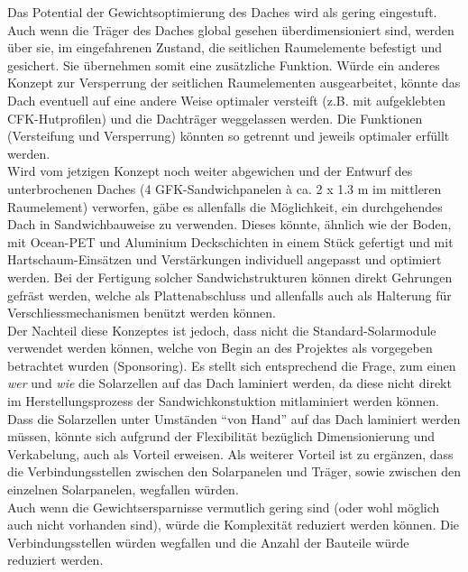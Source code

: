 Das Potential der Gewichtsoptimierung des Daches wird als gering eingestuft. Auch wenn die Träger des Daches global gesehen überdimensioniert sind, werden über sie, im eingefahrenen Zustand, die seitlichen Raumelemente befestigt und gesichert. Sie übernehmen somit eine zusätzliche Funktion. Würde ein anderes Konzept zur Versperrung der seitlichen Raumelementen ausgearbeitet, könnte das Dach eventuell auf eine andere Weise optimaler versteift (z.B. mit aufgeklebten CFK-Hutprofilen) und die Dachträger weggelassen werden. Die Funktionen (Versteifung und Versperrung) könnten so getrennt und jeweils optimaler erfüllt werden.\\
Wird vom jetzigen Konzept noch weiter abgewichen und der Entwurf des unterbrochenen Daches (4 GFK-Sandwichpanelen à ca. 2 x 1.3 m im mittleren Raumelement) verworfen, gäbe es allenfalls die Möglichkeit, ein durchgehendes Dach in Sandwichbauweise zu verwenden. Dieses könnte, ähnlich wie der Boden, mit Ocean-PET und Aluminium Deckschichten in einem Stück gefertigt und mit Hartschaum-Einsätzen und Verstärkungen individuell angepasst und optimiert werden.
Bei der Fertigung solcher Sandwichstrukturen können direkt Gehrungen gefräst werden, welche als Plattenabschluss und allenfalls auch als Halterung für Verschliessmechanismen benützt werden können.\\
Der Nachteil diese Konzeptes ist jedoch, dass nicht die Standard-Solarmodule verwendet werden können, welche von Begin an des Projektes als vorgegeben betrachtet wurden (Sponsoring). Es stellt sich entsprechend die Frage, zum einen \emph{wer} und \emph{wie} die Solarzellen auf das Dach laminiert werden, da diese nicht direkt im Herstellungsprozess der Sandwichkonstuktion mitlaminiert werden können. Dass die Solarzellen unter Umständen ``von Hand'' auf das Dach laminiert werden müssen, könnte sich aufgrund der Flexibilität bezüglich Dimensionierung und Verkabelung, auch als Vorteil erweisen. Als weiterer Vorteil ist zu ergänzen, dass die Verbindungsstellen zwischen den Solarpanelen und Träger, sowie zwischen den einzelnen Solarpanelen, wegfallen würden.\\
Auch wenn die Gewichtsersparnisse vermutlich gering sind (oder wohl möglich auch nicht vorhanden sind), würde die Komplexität reduziert werden können. Die Verbindungsstellen würden wegfallen und die Anzahl der Bauteile würde reduziert werden.


